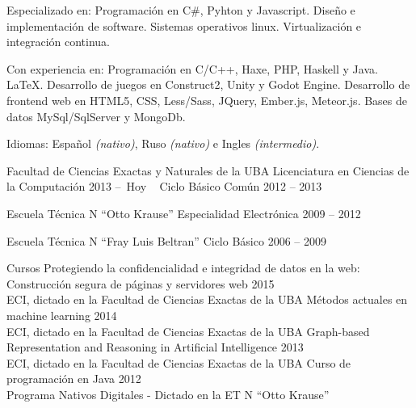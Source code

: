 \documentclass[10pt,a4paper]{article}
\begin{document}
\spacedhrule{0.3em}{-0.4em}


\inlineheadsection  %
  {Especializado en:}
  {Programación en C\#, Pyhton y Javascript. Diseño e implementación de software. Sistemas operativos linux. Virtualización e integración continua.}

\inlineheadsection  %
  {Con experiencia en:}
  {Programación en C/C++, Haxe, PHP, Haskell y Java. \LaTeX. Desarrollo de juegos en Construct2, Unity y Godot Engine. Desarrollo de frontend web en HTML5, CSS, Less/Sass, JQuery, Ember.js, Meteor.js. Bases de datos MySql/SqlServer y MongoDb.}

  \vspace{0.5em}
\inlineheadsection
  {Idiomas:}
  {Español \emph{(nativo)}, Ruso \emph{(nativo)} e Ingles \emph{(intermedio)}.}


\spacedhrule{1.9em}{-0.4em}


\vspace{0.2em}
\headedsection
  {Facultad de Ciencias Exactas y Naturales de la UBA}
  {\textsc{}} {%
  \headedsubsection
    {Licenciatura en Ciencias de la Computación}
    {2013 --\  Hoy \ }{}
  \headedsubsection
    {Ciclo Básico Común}
    {2012 -- 2013}{}
}

\vspace{0.2em}
\headedsection
  {Escuela Técnica N ``Otto Krause''}
  {\textsc{}} {%
  \headedsubsection
    {Especialidad Electrónica}
    {2009 -- 2012} {}
}

\vspace{0.2em}
\headedsection
  {Escuela Técnica N ``Fray Luis Beltran''}
  {\textsc{}} {%
  \headedsubsection
    {Ciclo Básico}
    {2006 -- 2009} {}
}

\vspace{0.2em}
\headedsection
  {Cursos}
  {\textsc{}} {%
  \headedsubsection
    {Protegiendo la confidencialidad e integridad de datos en la web:\\
    \indent Construcción segura de páginas y servidores web}
    {2015}{\\
    ECI, dictado en la Facultad de Ciencias Exactas de la UBA}
  \headedsubsection
    {Métodos actuales en machine learning}
    {2014}{\\
    ECI, dictado en la Facultad de Ciencias Exactas de la UBA}
  \headedsubsection
    {Graph-based Representation and Reasoning in Artificial Intelligence}
    {2013}{\\
    ECI, dictado en la Facultad de Ciencias Exactas de la UBA}
  \headedsubsection
    {Curso de programación en Java}
    {2012}{\\
    Programa Nativos Digitales - Dictado en la ET N ``Otto Krause''}
}
\end{document}
